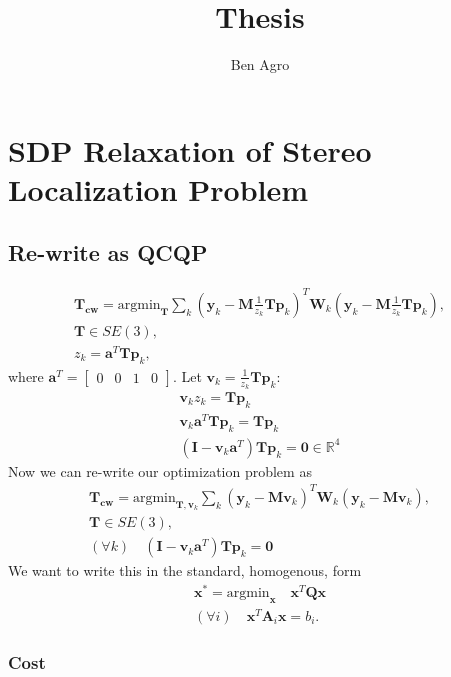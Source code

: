 \documentclass{article}
\title{Thesis}
\author{Ben Agro}
\date{}
\newcommand{\mbf}[1]{\mathbf{#1}}
\begin{document}
\maketitle

\section{SDP Relaxation of Stereo Localization Problem}

\subsection{Re-write as QCQP}

\begin{align}
\mbf{T_{cw}} = \text{argmin}_{\mbf{T}} \sum_k (\mbf{y}_k - \mbf{M} \frac{1}{z_k} \mbf{T} \mbf{p}_k)^T \mbf{W}_k (\mbf{y}_k - \mbf{M} \frac{1}{z_k} \mbf{T} \mbf{p}_k),\\
\mbf{T} \in SE(3),\\
z_k = \mbf{a}^T \mbf{T} \mbf{p}_k,
\end{align}
where $\mbf{a}^T = \begin{bmatrix}0 & 0 & 1 & 0\end{bmatrix}.$
Let $\mbf{v}_k = \frac{1}{z_k}\mbf{T}\mbf{p}_k$:
\begin{align}
\mbf{v}_kz_k = \mbf{T}\mbf{p}_k\\
\mbf{v}_k \mbf{a}^T \mbf{T} \mbf{p}_k = \mbf{T}\mbf{p}_k\\
(\mbf{I} - \mbf{v}_k \mbf{a}^T)\mbf{T}\mbf{p}_k = \mbf{0} \in \mathbb R^4
\end{align}
Now we can re-write our optimization problem as
\begin{align}
\mbf{T_{cw}} = \text{argmin}_{\mbf{T}, \mbf{v}_k} \sum_k (\mbf{y}_k - \mbf{M} \mbf{v}_k)^T \mbf{W}_k (\mbf{y}_k - \mbf{M} \mbf{v}_k),\\
\mbf{T} \in SE(3),\\
(\forall k) \quad (\mbf{I} - \mbf{v}_k \mbf{a}^T)\mbf{T}\mbf{p}_k = \mbf{0}
\end{align}
We want to write this in the standard, homogenous, form 
\begin{align}
\mbf{x}^* = \text{argmin}_{\mbf{x}} \quad \mbf{x}^T \mbf{Q} \mbf{x}\\
(\forall i) \quad \mbf{x}^T \mbf{A}_i \mbf{x} = b_i.
\end{align}

\subsubsection{Cost}
\end{document}
